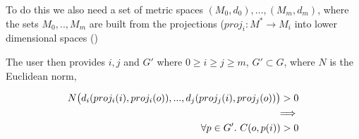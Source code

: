 To do this we also need a set of metric spaces $(M_0,d_0),...,(M_m,d_m)$, where the sets $M_0,..,M_m$ are built from the projections ($proj_i:M^{*} \to M_i$ into lower dimensional spaces ()

The user then provides $i,j$ and $G'$ where $0 \geq i \geq j \geq m$, $G' \subset G$, where $N$ is the Euclidean norm,

\begin{align*}
  N\big{(} d_i(proj_i(i),proj_i(o)) ,..., d_j(proj_j(i),proj_j(o)) \big{)} > 0 \\
\implies \\
\forall p \in G'.\ C(o,p(i)) > 0 \\
\end{align*}


